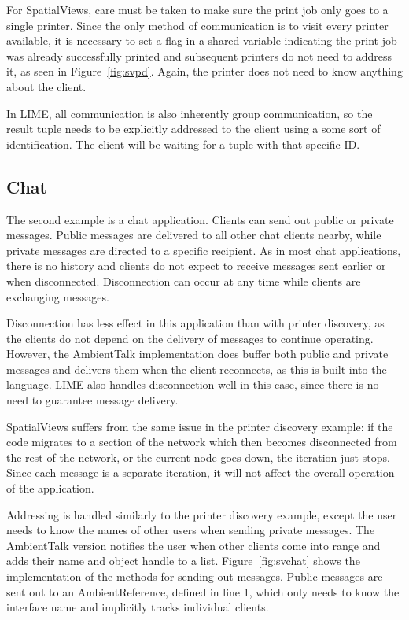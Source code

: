 \documentclass{sig-alternate}
\begin{document}
For SpatialViews, care must be taken to make sure the print job only goes to a single printer. Since the only method of communication is to visit every printer available, it is necessary to set a flag in a shared variable indicating the print job was already successfully printed and subsequent printers do not need to address it, as seen in Figure~\ref{fig:svpd}. Again, the printer does not need to know anything about the client.

In LIME, all communication is also inherently group communication, so the result tuple needs to be explicitly addressed to the client using a some sort of identification. The client will be waiting for a tuple with that specific ID.

\subsection{Chat}


The second example is a chat application. Clients can send out public or private messages. Public messages are delivered to all other chat clients nearby, while private messages are directed to a specific recipient. As in most chat applications, there is no history and clients do not expect to receive messages sent earlier or when disconnected. Disconnection can occur at any time while clients are exchanging messages.

Disconnection has less effect in this application than with printer discovery, as the clients do not depend on the delivery of messages to continue operating. However, the AmbientTalk implementation does buffer both public and private messages and delivers them when the client reconnects, as this is built into the language. LIME also handles disconnection well in this case, since there is no need to guarantee message delivery. 

SpatialViews suffers from the same issue in the printer discovery example: if the code migrates to a section of the network which then becomes disconnected from the rest of the network, or the current node goes down, the iteration just stops. Since each message is a separate iteration, it will not affect the overall operation of the application.

Addressing is handled similarly to the printer discovery example, except the user needs to know the names of other users when sending private messages. The AmbientTalk version notifies the user when other clients come into range and adds their name and object handle to a list. Figure~\ref{fig:svchat} shows the implementation of the methods for sending out messages. Public messages are sent out to an AmbientReference, defined in line 1, which only needs to know the interface name and implicitly tracks individual clients.
\end{document}
